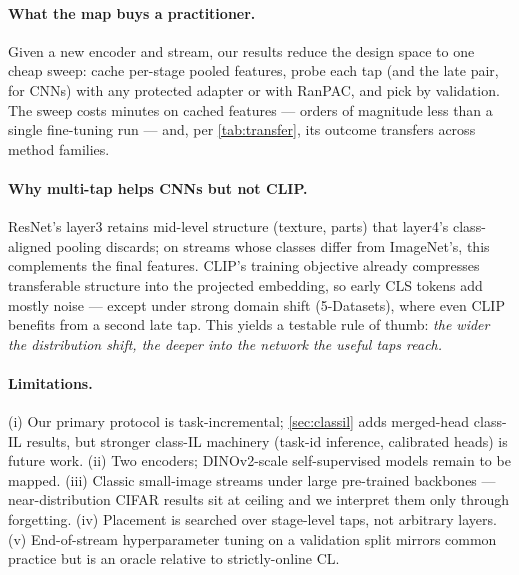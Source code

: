 \documentclass{article} %
\begin{document}
\paragraph{What the map buys a practitioner.} Given a new encoder and stream,
our results reduce the design space to one cheap sweep: cache per-stage pooled
features, probe each tap (and the late pair, for CNNs) with any protected
adapter or with RanPAC, and pick by validation. The sweep costs minutes on
cached features --- orders of magnitude less than a single fine-tuning run ---
and, per \cref{tab:transfer}, its outcome transfers across method families.

\paragraph{Why multi-tap helps CNNs but not CLIP.} ResNet's layer3 retains
mid-level structure (texture, parts) that layer4's class-aligned pooling
discards; on streams whose classes differ from ImageNet's, this complements
the final features. CLIP's training objective already compresses transferable
structure into the projected embedding, so early CLS tokens add mostly noise
--- except under strong domain shift (5-Datasets), where even CLIP benefits
from a second late tap. This yields a testable rule of thumb: \emph{the wider
the distribution shift, the deeper into the network the useful taps reach.}

\paragraph{Limitations.} (i) Our primary protocol is task-incremental;
\cref{sec:classil} adds merged-head class-IL results, but stronger class-IL
machinery (task-id inference, calibrated heads) is future work. (ii) Two
encoders; DINOv2-scale
self-supervised models remain to be mapped. (iii) Classic small-image streams
under large pre-trained backbones --- near-distribution CIFAR results sit at
ceiling and we interpret them only through forgetting. (iv) Placement is
searched over stage-level taps, not arbitrary layers. (v) End-of-stream
hyperparameter tuning on a validation split mirrors common practice but is an
oracle relative to strictly-online CL.
\end{document}
